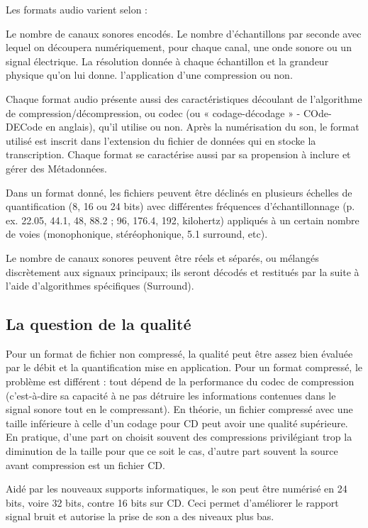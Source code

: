 \documentclass{report}
\begin{document}
Les formats audio varient selon :

    Le nombre de canaux sonores encodés.
    Le nombre d'échantillons par seconde avec lequel on découpera numériquement, pour chaque canal, une onde sonore ou un signal électrique.
    La résolution donnée à chaque échantillon et la grandeur physique qu'on lui donne.
    l'application d'une compression ou non.

Chaque format audio présente aussi des caractéristiques découlant de l'algorithme de compression/décompression, ou codec (ou « codage-décodage » - COde-DECode en anglais), qu'il utilise ou non. Après la numérisation du son, le format utilisé est inscrit dans l'extension du fichier de données qui en stocke la transcription. Chaque format se caractérise aussi par sa propension à inclure et gérer des Métadonnées.

Dans un format donné, les fichiers peuvent être déclinés en plusieurs échelles de quantification (8, 16 ou 24 bits) avec différentes fréquences d'échantillonnage (p. ex. 22.05, 44.1, 48, 88.2 ; 96, 176.4, 192, kilohertz) appliqués à un certain nombre de voies (monophonique, stéréophonique, 5.1 surround, etc).

Le nombre de canaux sonores peuvent être réels et séparés, ou mélangés discrètement aux signaux principaux; ils seront décodés et restitués par la suite à l'aide d'algorithmes spécifiques (Surround).

\subsection{La question de la qualité}
Pour un format de fichier non compressé, la qualité peut être assez bien évaluée par le débit et la quantification mise en application. Pour un format compressé, le problème est différent : tout dépend de la performance du codec de compression (c'est-à-dire sa capacité à ne pas détruire les informations contenues dans le signal sonore tout en le compressant). En théorie, un fichier compressé avec une taille inférieure à celle d'un codage pour CD peut avoir une qualité supérieure. En pratique, d'une part on choisit souvent des compressions privilégiant trop la diminution de la taille pour que ce soit le cas, d'autre part souvent la source avant compression est un fichier CD.

Aidé par les nouveaux supports informatiques, le son peut être numérisé en 24 bits, voire 32 bits, contre 16 bits sur CD. Ceci permet d'améliorer le rapport signal bruit et autorise la prise de son a des niveaux plus bas.
\end{document}
